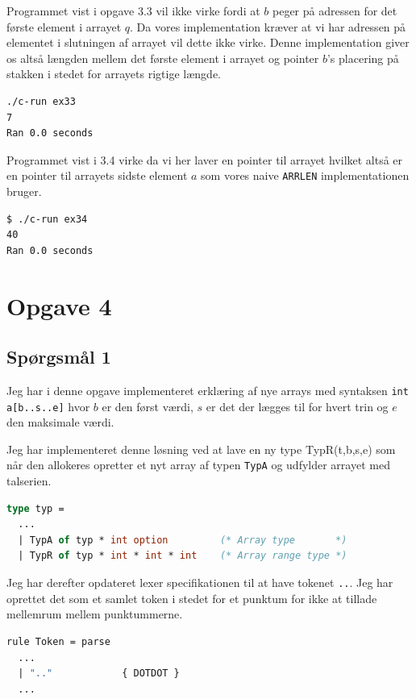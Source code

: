 \documentclass[danish,a4paper]{report}
\begin{document}
Programmet vist i opgave 3.3 vil ikke virke fordi at $b$ peger på adressen for det første element i arrayet $q$. Da vores implementation kræver at vi har adressen på elementet i slutningen af arrayet vil dette ikke virke. Denne implementation giver os altså længden mellem det første element i arrayet og pointer $b$'s placering på stakken i stedet for arrayets rigtige længde.


\begin{lstlisting}[language=bash]
./c-run ex33
7
Ran 0.0 seconds

\end{lstlisting}

Programmet vist i 3.4 virke da vi her laver en pointer til arrayet hvilket altså er en pointer til arrayets sidste element $a$ som vores naive \texttt{ARRLEN} implementationen bruger.

\begin{lstlisting}[language=bash]
$ ./c-run ex34
40
Ran 0.0 seconds
\end{lstlisting}

\chapter*{Opgave 4}
\section*{Spørgsmål 1}

Jeg har i denne opgave implementeret erklæring af nye arrays med syntaksen \texttt{int a[b..s..e]} hvor $b$ er den først værdi, $s$ er det der lægges til for hvert trin og $e$ den maksimale værdi.

Jeg har implementeret denne løsning ved at lave en ny type TypR(t,b,s,e) som når den allokeres opretter et nyt array af typen \texttt{TypA} og udfylder arrayet med talserien.

  \begin{lstlisting}[language=ML]
type typ =
  ...
  | TypA of typ * int option         (* Array type       *)
  | TypR of typ * int * int * int    (* Array range type *)
\end{lstlisting}

Jeg har derefter opdateret lexer specifikationen til at have tokenet \texttt{..}. Jeg har oprettet det som et samlet token i stedet for et punktum for ikke at tillade mellemrum mellem punktummerne.

\begin{lstlisting}[language=ML]
rule Token = parse
  ...
  | ".."            { DOTDOT }
  ...
\end{lstlisting}
\end{document}
